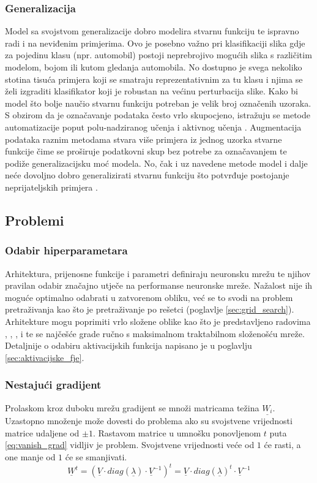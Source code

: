 \documentclass[times, utf8, numeric, diplomski]{fer}
\def\mat#1{\underline{#1}}
\def\secref#1{(poglavlje \ref{#1})}
\begin{document}
\subsubsection{Generalizacija}
\label{sec:generalizacija}
Model sa svojstvom generalizacije dobro modelira stvarnu funkciju te ispravno radi i na neviđenim primjerima. Ovo je posebno važno pri klasifikaciji slika gdje za pojedinu klasu (npr. automobil) postoji neprebrojivo mogućih slika s različitim modelom, bojom ili kutom gledanja automobila. No dostupno je svega nekoliko stotina tisuća primjera koji se smatraju reprezentativnim za tu klasu i njima se želi izgraditi klasifikator koji je robustan na većinu perturbacija slike. Kako bi model što bolje naučio stvarnu funkciju potreban je velik broj označenih uzoraka. S obzirom da je označavanje podataka često vrlo skupocjeno, istražuju se metode automatizacije poput polu-nadziranog učenja i aktivnog učenja \citep{active_learn}. Augmentacija podataka raznim metodama stvara više primjera iz jednog uzorka stvarne funkcije čime se proširuje podatkovni skup bez potrebe za označavanjem te podiže generalizacijsku moć modela. No, čak i uz navedene metode model i dalje neće dovoljno dobro generalizirati stvarnu funkciju što potvrđuje postojanje neprijateljskih primjera \citep{intriguing_props}.

\subsection{Problemi}
\subsubsection{Odabir hiperparametara}
Arhitektura, prijenosne funkcije i parametri definiraju neuronsku mrežu te njihov pravilan odabir značajno utječe na performanse neuronske mreže. Nažalost nije ih moguće optimalno odabrati u zatvorenom obliku, već se to svodi na problem pretraživanja kao što je pretraživanje po rešetci \secref{sec:grid_search}. Arhitekture mogu poprimiti vrlo složene oblike kao što je predstavljeno radovima \citet{highwaynet}, \citet{resnet}, \citet{densenet}, \citet{inceptionnet} i \citet{yolo} te se najčešće grade ručno s maksimalnom traktabilnom složenošću mreže. Detaljnije o odabiru aktivacijskih funkcija napisano je u poglavlju \ref{sec:aktivacijske_fje}.

\subsubsection{Nestajući gradijent}
\label{sec:nestajući_grad}
Prolaskom kroz duboku mrežu gradijent se množi matricama težina $\mat{W_i}$. Uzastopno množenje može dovesti do problema ako su svojstvene vrijednosti matrice udaljene od $\pm 1$. Rastavom matrice u umnošku ponovljenom $t$ puta \eqref{eq:vanish_grad} vidljiv je problem. Svojstvene vrijednosti veće od $1$ će rasti, a one manje od $1$ će se smanjivati. \citep[poglavlje~8.2.5]{goodfellowbook}
\begin{equation}
\label{eq:vanish_grad}
\mat{W}^t = (\mat{V} \cdot diag(\mat{\lambda}) \cdot \mat{V}^{-1})^t = \mat{V} \cdot diag(\mat{\lambda})^t \cdot \mat{V}^{-1}
\end{equation}
\end{document}
